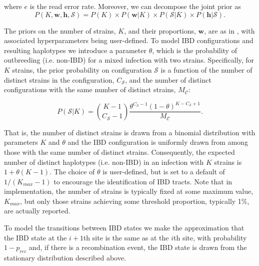 \documentclass[9pt]{article}
\begin{document}
\noindent where $e$ is the read error rate.  Moreover, we can decompose the joint prior as
\begin{equation}
P(K, \mathbf{w}, \mathbf{h}, \mathcal{S}) = P(K) \times P(\mathbf{w}|K) \times P(\mathcal{S}|K) \times P(\mathbf{h}|\mathcal{S}).
\end{equation}

\noindent The priors on the number of strains, $K$, and their proportions, $\mathbf{w}$, are as in \citet{Zhu2017}, with associated hyperparameters being user-defined.  To model IBD configurations and resulting haplotypes we introduce a parameter $\theta$, which is the probability of outbreeding (i.e. non-IBD) for a mixed infection with two strains.  Specifically, for $K$ strains, the prior probability on configuration $\mathcal{S}$ is a function of the number of distinct strains in the configuration, $C_{\mathcal{S}}$, and the number of distinct configurations with the same number of distinct strains, $M_{\mathcal{C}}$:

\begin{equation}
    P(\mathcal{S}|K) = {K-1 \choose C_{\mathcal{S}}-1} \frac{\theta^{C_{\mathcal{S}}-1}(1-\theta)^{K-C_{\mathcal{S}}+1}}{M_{\mathcal{C}}}.
\end{equation}

\noindent That is, the number of distinct strains is drawn from a binomial distribution with parameters $K$ and $\theta$ and the IBD configuration is uniformly drawn from among those with the same number of distinct strains.  Consequently, the expected number of distinct haplotypes (i.e. non-IBD) in an infection with $K$ strains is $1+\theta (K-1)$. The choice of $\theta$ is user-defined, but is set to a default of $1/(K_{max}-1)$ to encourage the identification of IBD tracts.  Note that in implementation, the number of strains is typically fixed at some maximum value, $K_{max}$, but only those strains achieving some threshold proportion, typically 1\%, are actually reported.

To model the transitions between IBD states we make the approximation that the IBD state at the $i+1$th site is the same as at the $i$th site, with probability $1-p_{rec}$ and, if there is a recombination event, the IBD state is drawn from the stationary distribution described above.  
\end{document}
